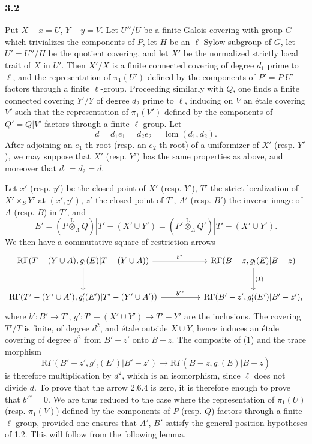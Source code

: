 \documentclass[11pt]{article}
\providecommand{\lten}{\overset{\mathrm L}{\otimes}}
\providecommand{\lten}{\overset{\mathrm L}{\otimes}}
\providecommand{\lten}{\overset{\mathrm L}{\otimes}}
\providecommand{\lten}{\overset{\mathrm L}{\otimes}}
\providecommand{\lten}{\overset{\mathrm L}{\otimes}}
\providecommand{\lten}{\overset{\mathrm L}{\otimes}}
\begin{document}
\subsubsection*{3.2}
Put $X-x=U$, $Y-y=V$. Let $U''/U$ be a finite Galois covering with group $G$ which trivializes the components of $P$, let $H$ be an $\ell$-Sylow subgroup of $G$, let $U'=U''/H$ be the quotient covering, and let $X'$ be the normalized strictly local trait of $X$ in $U'$. Then $X'/X$ is a finite connected covering of degree $d_1$ prime to $\ell$, and the representation of $\pi_1(U')$ defined by the components of $P'=P|U'$ factors through a finite $\ell$-group. Proceeding similarly with $Q$, one finds a finite connected covering $Y'/Y$ of degree $d_2$ prime to $\ell$, inducing on $V$ an étale covering $V'$ such that the representation of $\pi_1(V')$ defined by the components of $Q'=Q|V'$ factors through a finite $\ell$-group. Let
\[
d=d_1e_1=d_2e_2=\operatorname{lcm}(d_1,d_2).
\]
After adjoining an $e_1$-th root (resp. an $e_2$-th root) of a uniformizer of $X'$ (resp. $Y'$), we may suppose that $X'$ (resp. $Y'$) has the same properties as above, and moreover that $d_1=d_2=d$.

Let $x'$ (resp. $y'$) be the closed point of $X'$ (resp. $Y'$), $T'$ the strict localization of $X'\times_S Y'$ at $(x',y')$, $z'$ the closed point of $T'$, $A'$ (resp. $B'$) the inverse image of $A$ (resp. $B$) in $T'$, and
\[
E'=(P\lten_{\Lambda}Q)|T'-(X'\cup Y')
   =(P'\lten_{\Lambda}Q')|T'-(X'\cup Y').
\]
We then have a commutative square of restriction arrows
\[
\begin{tikzcd}[column sep=huge,row sep=large]
\mathrm R\Gamma(T-(Y\cup A),g_!(E)|T-(Y\cup A))
 \arrow[r,"b^*"] \arrow[d]
&
\mathrm R\Gamma(B-z,g_!(E)|B-z) \arrow[d,"(1)"]\\
\mathrm R\Gamma(T'-(Y'\cup A'),g'_!(E')|T'-(Y'\cup A'))
 \arrow[r,"b'{}^*"]
&
\mathrm R\Gamma(B'-z',g'_!(E')|B'-z') ,
\end{tikzcd}
\]
where $b':B'\to T'$, $g':T'-(X'\cup Y')\to T'-Y'$ are the inclusions. The covering $T'/T$ is finite, of degree $d^2$, and étale outside $X\cup Y$, hence induces an étale covering of degree $d^2$ from $B'-z'$ onto $B-z$. The composite of (1) and the trace morphism
\[
\mathrm R\Gamma(B'-z',g'_!(E')|B'-z')
 \longrightarrow
\mathrm R\Gamma(B-z,g_!(E)|B-z)
\]
is therefore multiplication by $d^2$, which is an isomorphism, since $\ell$ does not divide $d$. To prove that the arrow 2.6.4 is zero, it is therefore enough to prove that $b'{}^*=0$. We are thus reduced to the case where the representation of $\pi_1(U)$ (resp. $\pi_1(V)$) defined by the components of $P$ (resp. $Q$) factors through a finite $\ell$-group, provided one ensures that $A'$, $B'$ satisfy the general-position hypotheses of 1.2. This will follow from the following lemma.
\end{document}
